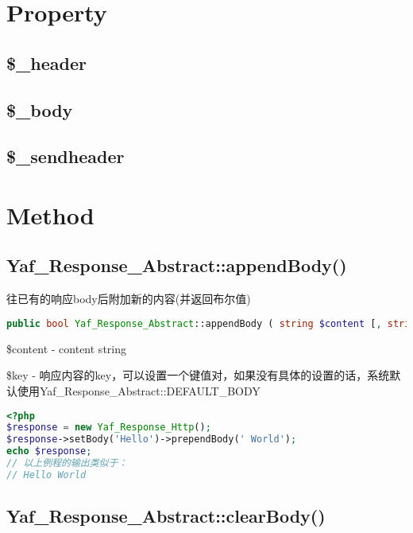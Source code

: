 \section{Property}


\subsection{\$\_header}
\subsection{\$\_body}
\subsection{\$\_sendheader}

\section{Method}


\subsection{Yaf\_Response\_Abstract::appendBody()}




往已有的响应body后附加新的内容(并返回布尔值)



\begin{lstlisting}[language=PHP]
public bool Yaf_Response_Abstract::appendBody ( string $content [, string $key ] )
\end{lstlisting}

\begin{compactitem}
\item \$content - content string
\item \$key - 响应内容的key，可以设置一个键值对，如果没有具体的设置的话，系统默认使用Yaf\_Response\_Abstract::DEFAULT\_BODY
\end{compactitem}

\begin{lstlisting}[language=PHP]
<?php
$response = new Yaf_Response_Http();
$response->setBody('Hello')->prependBody(' World');
echo $response;
// 以上例程的输出类似于：
// Hello World
\end{lstlisting}



\subsection{Yaf\_Response\_Abstract::clearBody()}

